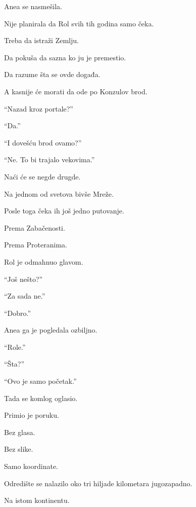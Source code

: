 Anea se nasmešila.

\bigskip

Nije planirala da Rol svih tih godina samo čeka.

\bigskip

Treba da istraži Zemlju.

Da pokuša da sazna ko ju je premestio.

Da razume šta se ovde događa.

\bigskip

A kasnije će morati da ode po Konzulov brod.

\bigskip

``Nazad kroz portale?''

``Da.''

``I dovešću brod ovamo?''

``Ne. To bi trajalo vekovima.''

\bigskip

Naći će se negde drugde.

Na jednom od svetova bivše Mreže.

\bigskip

Posle toga čeka ih još jedno putovanje.

Prema Zabačenosti.

Prema Proteranima.

\bigskip

Rol je odmahnuo glavom.

``Još nešto?''

``Za sada ne.''

``Dobro.''

\bigskip

Anea ga je pogledala ozbiljno.

``Role.''

``Šta?''

``Ovo je samo početak.''

\bigskip

Tada se komlog oglasio.

\bigskip

Primio je poruku.

Bez glasa.

Bez slike.

\bigskip

Samo koordinate.

\bigskip

Odredište se nalazilo oko tri hiljade kilometara jugozapadno.

Na istom kontinentu.

\bigskip

